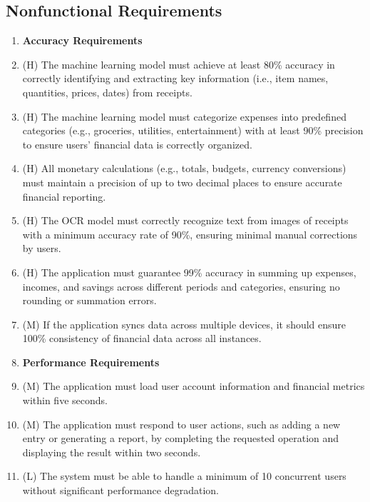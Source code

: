 \documentclass[12pt]{article}
\begin{document}
\subsection{Nonfunctional Requirements}
\begin{enumerate}[label=NFR\arabic*]
  \item[] \textbf{Accuracy Requirements}
  \item (H) The machine learning model must achieve at least 80\% accuracy in
  correctly identifying and extracting key information (i.e., item names,
  quantities, prices, dates) from receipts.
  \item (H) The machine learning model must categorize expenses into predefined
  categories (e.g., groceries, utilities, entertainment) with at least 90\%
  precision to ensure users' financial data is correctly organized.
  \item (H) All monetary calculations (e.g., totals, budgets, currency
  conversions) must maintain a precision of up to two decimal places to ensure
  accurate financial reporting.
  \item (H) The OCR model must correctly recognize text from images of receipts
  with a minimum accuracy rate of 90\%, ensuring minimal manual corrections by
  users.
  \item (H) The application must guarantee 99\% accuracy in summing up expenses,
  incomes, and savings across different periods and categories, ensuring no
  rounding or summation errors.
  \item (M) If the application syncs data across multiple devices, it should
  ensure 100\% consistency of financial data across all instances.

  \item[]\textbf{Performance Requirements}
  \item (M) The application must load user account information and financial metrics within five seconds.
  \item (M) The application must respond to user actions, such as adding a new entry or generating a report, by completing 
  the requested operation and displaying the result within two seconds.
  \item (L) The system must be able to handle a minimum of 10 concurrent users without significant performance degradation.


\end{enumerate}
\end{document}
